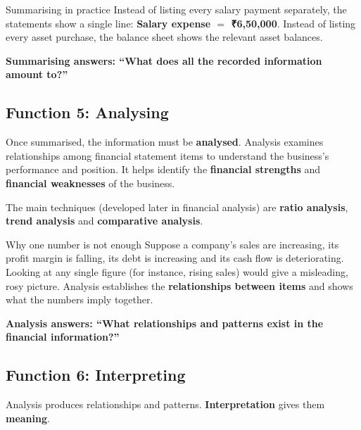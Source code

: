 \documentclass[11pt,a4paper]{article}
\newcommand{\Rs}{{\rsfont ₹}}
\begin{document}
\begin{exbox}{Summarising in practice}
Instead of listing every salary payment separately, the statements show a single line:
\textbf{Salary expense $=$ \Rs 6,50,000}. Instead of listing every asset purchase, the balance
sheet shows the relevant asset balances.
\end{exbox}

\begin{keybox}
\textbf{Summarising answers: ``What does all the recorded information amount to?''}
\end{keybox}

\subsection{Function 5: Analysing}

Once summarised, the information must be \textbf{analysed}. Analysis examines relationships
among financial statement items to understand the business's performance and position. It helps
identify the \textbf{financial strengths} and \textbf{financial weaknesses} of the business.

The main techniques (developed later in financial analysis) are \textbf{ratio analysis},
\textbf{trend analysis} and \textbf{comparative analysis}.

\begin{exbox}{Why one number is not enough}
Suppose a company's sales are increasing, its profit margin is falling, its debt is
increasing and its cash flow is deteriorating. Looking at any single figure (for instance, rising
sales) would give a misleading, rosy picture. Analysis establishes the \textbf{relationships
between items} and shows what the numbers imply together.
\end{exbox}

\begin{keybox}
\textbf{Analysis answers: ``What relationships and patterns exist in the financial information?''}
\end{keybox}

\subsection{Function 6: Interpreting}

Analysis produces relationships and patterns. \textbf{Interpretation} gives them \textbf{meaning}.
\end{document}

